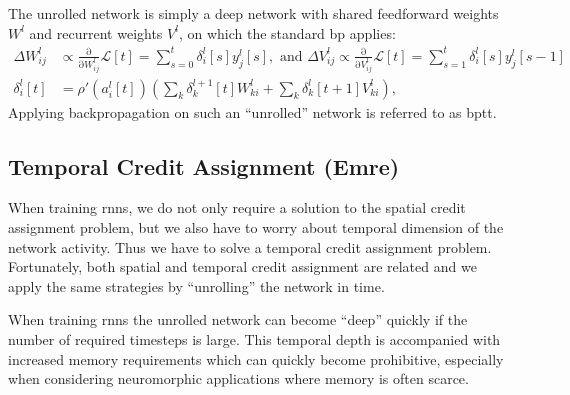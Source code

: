 \documentclass[journal,onecolumn,11pt]{IEEEtran}
\begin{document}
\begin{infobox}
\begin{mdframed}[backgroundcolor=black!10]
    The unrolled network is simply a deep network with shared feedforward weights $W^l$ and recurrent weights $V^l$, on which the standard \Gls{bp} applies:
    \begin{equation}\label{eq:bptt}
      \begin{split}
        \Delta {W_{ij}^{l}} &\propto \frac{\mathrm{\partial}}{\mathrm{\partial} W^{l}_{ij}} \mathcal{L}[t]  = \sum_{s=0}^t \delta_{i}^{l}[s]  y^{l}_j[s],\text{ and }\Delta {V_{ij}^{l}} \propto \frac{\mathrm{\partial}}{\mathrm{\partial} V^{l}_{ij}} \mathcal{L}[t]  = \sum_{s=1}^t \delta_{i}^{l}[s]  y^{l}_j[s-1]\\
        \delta_{i}^{l} [t] & = \rho'\left( a_i^l[t] \right) \left( \sum_k \delta_{k}^{l+1}[t] W_{ki}^{l} + \sum_k \delta_{k}^{l}[t+1] V_{ki}^{l} \right),
      \end{split}
    \end{equation}
    Applying backpropagation on such an ``unrolled'' network is referred to as \gls{bptt}.
  \end{mdframed}
\end{infobox}



\subsection{Temporal Credit Assignment (Emre)}
\label{sec:temporal_credit_assignment}

When training \glspl{rnn}, we do not only require a solution to the spatial credit assignment problem, but we also have to worry about temporal dimension of the network activity.
Thus we have to solve a temporal credit assignment problem.
Fortunately, both spatial and temporal credit assignment are related and we apply the same strategies by ``unrolling'' the network in time.

When training \glspl{rnn} the unrolled network can become ``deep'' quickly if the number of required timesteps is large. 
This temporal depth is accompanied with increased memory requirements which can quickly become prohibitive, especially when considering neuromorphic applications where memory is often scarce.
\end{document}
